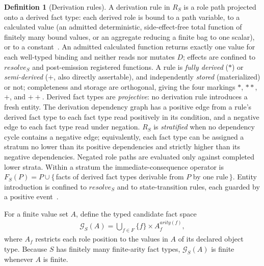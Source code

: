 \documentclass[10pt,twocolumn]{article}
\theoremstyle{plain}
\theoremstyle{definition}
\newtheorem{definition}{Definition}
\begin{document}
\begin{definition}[Derivation rules]\label{def:derive}
A derivation rule in $R_S$ is a role path projected onto a derived fact type: each derived role is bound to a path variable, to a calculated value (an admitted deterministic, side-effect-free total function of finitely many bound values, or an aggregate reducing a finite bag to one scalar), or to a constant~\cite{norma}. An admitted calculated function returns exactly one value for each well-typed binding and neither reads nor mutates $D$; effects are confined to $\mathit{resolve}_S$ and post-emission registered functions. A rule is \emph{fully derived} ($*$) or \emph{semi-derived} ($+$, also directly assertable), and independently \emph{stored} (materialized) or not; completeness and storage are orthogonal, giving the four markings $*$, $**$, $+$, and $++$. Derived fact types are \emph{projective}: no derivation rule introduces a fresh entity. The derivation dependency graph has a positive edge from a rule's derived fact type to each fact type read positively in its condition, and a negative edge to each fact type read under negation. $R_S$ is \emph{stratified} when no dependency cycle contains a negative edge; equivalently, each fact type can be assigned a stratum no lower than its positive dependencies and strictly higher than its negative dependencies. Negated role paths are evaluated only against completed lower strata. Within a stratum the immediate-consequence operator is $F_S(P)=P\cup\{\,$facts of derived fact types derivable from $P$ by one rule$\,\}$. Entity introduction is confined to $\mathit{resolve}_S$ and to state-transition rules, each guarded by a positive event~\cite{norma}.
\end{definition}
For a finite value set $A$, define the typed candidate fact space
\begin{align}
\mathcal{G}_S(A)=\bigcup_{f\in F}\{f\}\times A_f^{\mathit{arity}(f)}, \label{eq:candidates}
\end{align}
where $A_f$ restricts each role position to the values in $A$ of its declared object type. Because $S$ has finitely many finite-arity fact types, $\mathcal{G}_S(A)$ is finite whenever $A$ is finite.
\end{document}
